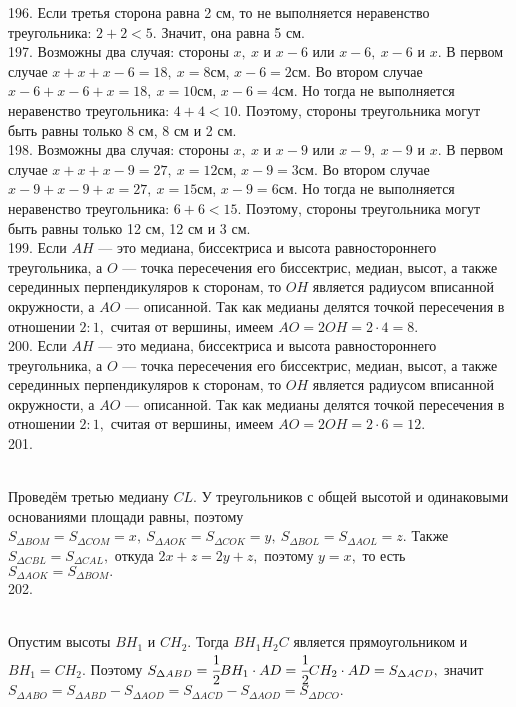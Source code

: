196. Если третья сторона равна 2 см, то не выполняется неравенство треугольника: $2+2<5.$ Значит, она равна 5 см.\\
197. Возможны два случая: стороны $x,\ x$ и $x-6$ или $x-6,\ x-6$ и $x.$ В первом случае $x+x+x-6=18,\ x=8$см, $x-6=2$см. Во втором случае $x-6+x-6+x=18,\ x=10$см, $x-6=4$см. Но тогда не выполняется неравенство треугольника: $4+4<10.$ Поэтому, стороны треугольника могут быть равны только 8 см, 8 см и 2 см.\\
198. Возможны два случая: стороны $x,\ x$ и $x-9$ или $x-9,\ x-9$ и $x.$ В первом случае $x+x+x-9=27,\ x=12$см, $x-9=3$см. Во втором случае $x-9+x-9+x=27,\ x=15$см, $x-9=6$см. Но тогда не выполняется неравенство треугольника: $6+6<15.$ Поэтому, стороны треугольника могут быть равны только 12 см, 12 см и 3 см.\\
199. Если $AH$ --- это медиана, биссектриса и высота равностороннего треугольника, а $O$ --- точка пересечения его биссектрис, медиан, высот, а также серединных перпендикуляров к сторонам, то $OH$ является радиусом вписанной окружности, а $AO$ --- описанной. Так как медианы делятся точкой пересечения в отношении $2:1,$ считая от вершины, имеем $AO=2OH=2\cdot4=8.$\\
200. Если $AH$ --- это медиана, биссектриса и высота равностороннего треугольника, а $O$ --- точка пересечения его биссектрис, медиан, высот, а также серединных перпендикуляров к сторонам, то $OH$ является радиусом вписанной окружности, а $AO$ --- описанной. Так как медианы делятся точкой пересечения в отношении $2:1,$ считая от вершины, имеем $AO=2OH=2\cdot6=12.$\\
201. \begin{figure}[ht!]
\end{figure}\\
Проведём третью медиану $CL.$ У треугольников с общей высотой и одинаковыми основаниями площади равны, поэтому $S_{\Delta BOM}=S_{\Delta COM}=x,\
S_{\Delta AOK}=S_{\Delta COK}=y,\ S_{\Delta BOL}=S_{\Delta AOL}=z.$ Также $S_{\Delta CBL}=S_{\Delta CAL},$ откуда $2x+z=2y+z,$ поэтому $y=x,$ то есть $S_{\Delta AOK}=S_{\Delta BOM}.$\\
202. \begin{figure}[ht!]
\end{figure}\\
Опустим высоты $BH_1$ и $CH_2.$ Тогда $BH_1H_2C$ является прямоугольником и $BH_1=CH_2.$ Поэтому $S_{\Delta ABD}=\cfrac{1}{2}BH_1\cdot AD=\cfrac{1}{2}CH_2\cdot AD=S_{\Delta ACD},$ значит $S_{\Delta ABO}=S_{\Delta ABD}-S_{\Delta AOD}=S_{\Delta ACD}-S_{\Delta AOD}=S_{\Delta DCO}.$\\
